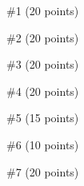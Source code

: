 \begin{problem}{\#1 (20 points)}
\end{problem}
\begin{solution}
\end{solution}

\begin{problem}{\#2 (20 points)}
\end{problem}
\begin{solution}
\end{solution}

\begin{problem}{\#3 (20 points)}
\end{problem}
\begin{solution}
\end{solution}

\begin{problem}{\#4 (20 points)}
\end{problem}
\begin{solution}
\end{solution}

\begin{problem}{\#5 (15 points)}
\end{problem}
\begin{solution}
\end{solution}

\begin{problem}{\#6 (10 points)}
\end{problem}
\begin{solution}
\end{solution}

\begin{problem}{\#7 (20 points)}
\end{problem}
\begin{solution}
\end{solution}